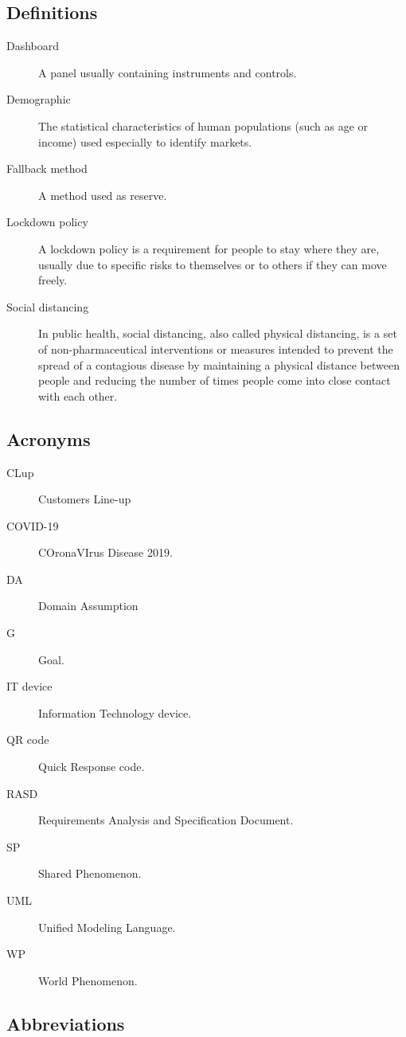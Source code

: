 \documentclass[../../main.tex]{subfiles}
\begin{document}
\subsection{Definitions}

\begin{description}
    
    \item[Dashboard] A panel usually containing instruments and controls.
    
    \item[Demographic] The statistical characteristics of human populations (such as age or income) used especially to identify markets.
    
    \item[Fallback method] A method used as reserve.

    \item[Lockdown policy] A lockdown policy is a requirement for people to stay where they are, usually due to specific risks to themselves or to others if they can move freely. 

    \item[Social distancing] In public health, social distancing, also called physical distancing,
                             is a set of non-pharmaceutical interventions or measures intended to prevent the spread of a contagious disease by maintaining 
                             a physical distance between people and reducing the number of times people come into close contact with each other.
\end{description}

\subsection{Acronyms}

\begin{description}
    
    \item[CLup] Customers Line-up
    
    \item[COVID-19] COronaVIrus Disease 2019.
    
    \item[DA] Domain Assumption
    
    \item[G] Goal.
    
    \item[IT device] Information Technology device.
    
    \item[QR code] Quick Response code.
    
    \item[RASD] Requirements Analysis and Specification Document.
    
    \item[SP] Shared Phenomenon.
    
    \item[UML] Unified Modeling Language.
    
    \item[WP] World Phenomenon.
\end{description}

\subsection{Abbreviations}
\end{document}
